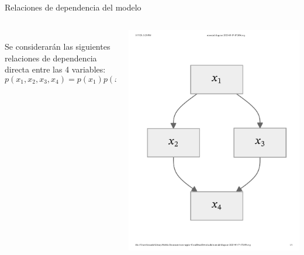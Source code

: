 \documentclass{beamer}
\begin{document}
\begin{frame}{Relaciones de dependencia del modelo}
    \begin{columns}

        \begin{column}{0.6\textwidth}
            \vspace{1.5cm}\\
            Se considerarán las siguientes relaciones de dependencia directa entre las 4 variables:
            \begin{equation*}
                p(x_1,x_2,x_3,x_4) = p(x_1)p(x_2|x_1)p(x_3|x_1)p(x_4|x_2,x_3)
            \end{equation*}
        \end{column}
        \begin{column}{0.39\textwidth}
            \centering\vspace{1cm}
            \includegraphics[width=\columnwidth]{net}
        \end{column}
    \end{columns}
\end{frame}
\end{document}

